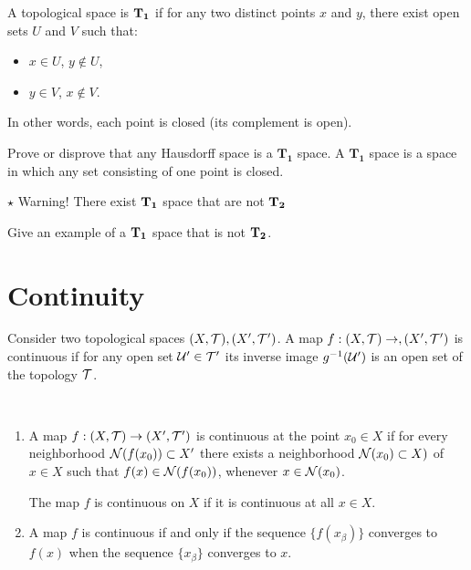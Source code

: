 \begin{definition}
    A topological space is ${\bf T_1}$ if for any two distinct points $x$ and $y$, there exist open sets $U$ and 
$V$ such that: 

\begin{itemize}
    \item $x\in U$, $y\notin U$,
    \item $y\in V$, $x\notin V$.
\end{itemize}
In other words, each point is closed (its complement is open).
\end{definition}





  


\begin{ex}\label{Ex:2}
Prove or disprove that any Hausdorff space is a $\mathbf{T_1}$ space. A $\mathbf{T_1}$ space is a space in which any set consisting of one point is closed. 
\end{ex}

$\star$  Warning! There exist ${\bf T_1}$ space that are not ${\bf T_2 }$
\begin{ex}\label{Ex:T_1neqT_2}
Give an example of a ${\bf T_1}$ space that is not ${\bf T_2 }$.
\end{ex}

 \section{Continuity}
\begin{definition}[{\bf Continuity}]
Consider two topological spaces $(X,\mathcal{T}),(X',\mathcal{T}')$. A map $f:(X,\mathcal{T})\to,(X',\mathcal{T}')$ is continuous if for any open set $\mathcal{U}'\in \mathcal{T}'$ its inverse image $g^{-1}(\mathcal{U}')$ is an open set of the topology $\mathcal{T}$.
\end{definition}

\begin{theorem}
\

\begin{enumerate}
\item A map $f:(X,\mathcal{T})\to(X',\mathcal{T}')$ is continuous at the point $x_0\in X$ if for every neighborhood $\mathcal{N}(f(x_0)) \subset X'$  there exists a neighborhood $\mathcal{N}(x_0 )\subset X)$ of $x\in X$ such that $f(x) \in \mathcal{N}(f(x_0))$, whenever $x \in\mathcal{N}(x_0)$.

The map $f$ is continuous on $X$ if it is continuous at all $x\in X$.

\item A map $f$ is continuous if and only if the sequence
$\{f(x_{\beta})\}$ converges to $f(x)$ when the sequence $\{x_{\beta}\}$ converges to $x$.
\end{enumerate}
\end{theorem}

